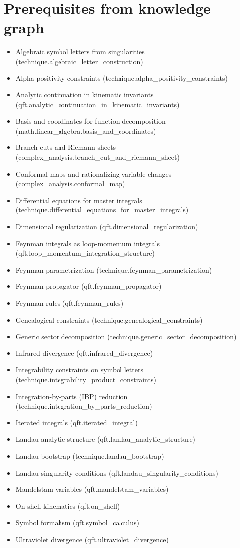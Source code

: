 \documentclass[a4paper,11pt]{article}
\begin{document}
\section*{Prerequisites from knowledge graph}
\begin{itemize}
\item Algebraic symbol letters from singularities (technique.algebraic\_letter\_construction)
\item Alpha-positivity constraints (technique.alpha\_positivity\_constraints)
\item Analytic continuation in kinematic invariants (qft.analytic\_continuation\_in\_kinematic\_invariants)
\item Basis and coordinates for function decomposition (math.linear\_algebra.basis\_and\_coordinates)
\item Branch cuts and Riemann sheets (complex\_analysis.branch\_cut\_and\_riemann\_sheet)
\item Conformal maps and rationalizing variable changes (complex\_analysis.conformal\_map)
\item Differential equations for master integrals (technique.differential\_equations\_for\_master\_integrals)
\item Dimensional regularization (qft.dimensional\_regularization)
\item Feynman integrals as loop-momentum integrals (qft.loop\_momentum\_integration\_structure)
\item Feynman parametrization (technique.feynman\_parametrization)
\item Feynman propagator (qft.feynman\_propagator)
\item Feynman rules (qft.feynman\_rules)
\item Genealogical constraints (technique.genealogical\_constraints)
\item Generic sector decomposition (technique.generic\_sector\_decomposition)
\item Infrared divergence (qft.infrared\_divergence)
\item Integrability constraints on symbol letters (technique.integrability\_product\_constraints)
\item Integration-by-parts (IBP) reduction (technique.integration\_by\_parts\_reduction)
\item Iterated integrals (qft.iterated\_integral)
\item Landau analytic structure (qft.landau\_analytic\_structure)
\item Landau bootstrap (technique.landau\_bootstrap)
\item Landau singularity conditions (qft.landau\_singularity\_conditions)
\item Mandelstam variables (qft.mandelstam\_variables)
\item On-shell kinematics (qft.on\_shell)
\item Symbol formalism (qft.symbol\_calculus)
\item Ultraviolet divergence (qft.ultraviolet\_divergence)
\end{itemize}


\end{document}
